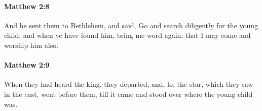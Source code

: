 		\paragraph{Matthew 2:8} %
			\label{MATTHEW-2-8}

			And he sent them to Bethlehem, and said, Go and search diligently for the young child; and when ye have found him, bring me word again, that I may come and worship him also.

			\begin{framed}
			\scriptsize
				\begin{compactdesc}
					\item[SBLG] 
				\end{compactdesc}
			\end{framed}

		\paragraph{Matthew 2:9} %
			\label{MATTHEW-2-9}

			When they had heard the king, they departed; and, lo, the star, which they saw in the east, went before them, till it came and stood over where the young child was.

